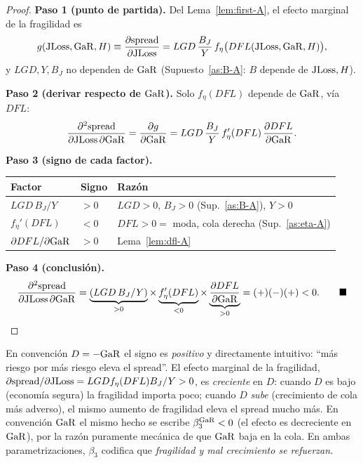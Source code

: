 \begin{proof}
\textbf{Paso 1 (punto de partida).} Del Lema~\ref{lem:first-A}, el efecto marginal de la fragilidad es
\[
g(\mathrm{JLoss},\mathrm{GaR},H)\equiv\frac{\partial \mathrm{spread}}{\partial \mathrm{JLoss}}=LGD\,\frac{B_J}{Y}\,f_\eta\big(DFL(\mathrm{JLoss},\mathrm{GaR},H)\big),
\]
y $LGD,Y,B_J$ no dependen de $\mathrm{GaR}$ (Supuesto~\ref{as:B-A}: $B$ depende de $\mathrm{JLoss},H$).

\textbf{Paso 2 (derivar respecto de $\mathrm{GaR}$).} Solo $f_\eta(DFL)$ depende de $\mathrm{GaR}$, vía $DFL$:
\[
\frac{\partial^2 \mathrm{spread}}{\partial \mathrm{JLoss}\,\partial \mathrm{GaR}}=\frac{\partial g}{\partial \mathrm{GaR}}=LGD\,\frac{B_J}{Y}\,f_\eta'(DFL)\,\frac{\partial DFL}{\partial \mathrm{GaR}}.
\]

\textbf{Paso 3 (signo de cada factor).}
\begin{center}
\begin{tabular}{lll}
\toprule
Factor & Signo & Razón \\
\midrule
$LGD\,B_J/Y$ & $>0$ & $LGD>0$, $B_J>0$ (Sup.~\ref{as:B-A}), $Y>0$ \\
$f_\eta'(DFL)$ & $<0$ & $DFL>0=$ moda, cola derecha (Sup.~\ref{as:eta-A}) \\
$\partial DFL/\partial \mathrm{GaR}$ & $>0$ & Lema~\ref{lem:dfl-A} \\
\bottomrule
\end{tabular}
\end{center}

\textbf{Paso 4 (conclusión).}
\[
\frac{\partial^2 \mathrm{spread}}{\partial \mathrm{JLoss}\,\partial \mathrm{GaR}}=\underbrace{(LGD\,B_J/Y)}_{>0}\times\underbrace{f_\eta'(DFL)}_{<0}\times\underbrace{\frac{\partial DFL}{\partial \mathrm{GaR}}}_{>0}=(+)(-)(+)<0. \qquad\blacksquare
\]
\end{proof}

\begin{remark}
En convención $D=-\mathrm{GaR}$ el signo es \emph{positivo} y directamente intuitivo: ``más riesgo por más riesgo eleva el spread''. El efecto marginal de la fragilidad, $\partial\mathrm{spread}/\partial\mathrm{JLoss}=LGD f_\eta(DFL)B_J/Y>0$, es \emph{creciente} en $D$: cuando $D$ es bajo (economía segura) la fragilidad importa poco; cuando $D$ \emph{sube} (crecimiento de cola más adverso), el mismo aumento de fragilidad eleva el spread mucho más. En convención $\mathrm{GaR}$ el mismo hecho se escribe $\beta_3^{\mathrm{GaR}}<0$ (el efecto es decreciente en $\mathrm{GaR}$), por la razón puramente mecánica de que $\mathrm{GaR}$ baja en la cola. En ambas parametrizaciones, $\beta_3$ codifica que \emph{fragilidad y mal crecimiento se refuerzan}.
\end{remark}

